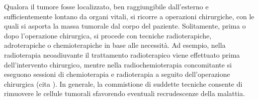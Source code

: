 \documentclass[12pt,a4paper,twoside]{report}
\begin{document}
	Qualora il tumore fosse localizzato, ben raggiungibile dall'esterno e sufficientemente lontano da organi vitali, si ricorre a operazioni chirurgiche, con le quali si asporta la massa tumorale dal corpo del paziente. Solitamente, prima o dopo l'operazione chirurgica, si procede con tecniche radioterapiche, adroterapiche o chemioterapiche in base alle necessità. Ad esempio, nella radioterapia neoadiuvante il trattamento radioterapico viene effettuato prima dell'intervento chirurgico, mentre nella radiochemioterapia concomitante si eseguono sessioni di chemioterapia e radioterapia a seguito dell'operazione chirurgica (cita
	). In generale, la commistione di suddette tecniche consente di rimuovere le cellule tumorali sfavorendo eventuali recrudescenze della malattia.
	
\end{document}
